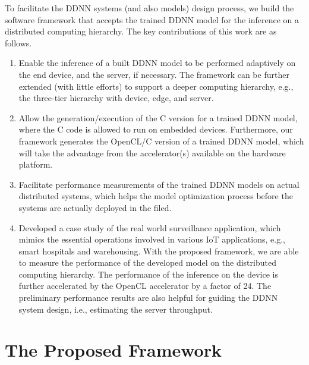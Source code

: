 \documentclass[conference]{IEEEtran}
\begin{document}
To facilitate the DDNN systems (and also models) design process, we build the software framework that accepts the trained DDNN model for the inference on a distributed computing hierarchy. The key contributions of this work are as follows.
\begin{enumerate}
  \item Enable the inference of a built DDNN model to be performed adaptively on the end device, and the server, if necessary. The framework can be further extended (with little efforts) to support a deeper computing hierarchy, e.g., the three-tier hierarchy with device, edge, and server.
  \item Allow the generation/execution of the C version for a trained DDNN model, where the C code is allowed to run on embedded devices. Furthermore, our framework generates the OpenCL/C version of a trained DDNN model, which will take the advantage from the accelerator(s) available on the hardware platform.
  \item Facilitate performance measurements of the trained DDNN models on actual distributed systems, which helps the model optimization process before the systems are actually deployed in the filed.
  \item Developed a case study of the real world surveillance application, which mimics the essential operations involved in various IoT applications, e.g., smart hospitals and warehousing. With the proposed framework, we are able to measure the performance of the developed model on the distributed computing hierarchy. The performance of the inference on the device is further accelerated by the OpenCL accelerator by a factor of 24. The preliminary performance results are also helpful for guiding the DDNN system design, i.e., estimating the server throughput.
\end{enumerate}

\section{The Proposed Framework}
\label{sec:framework}
\end{document}
